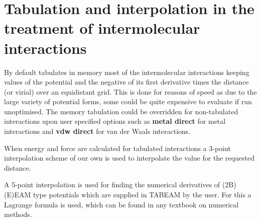 \section{Tabulation and interpolation in the treatment of intermolecular interactions}

By default \D tabulates in memory most of the intermolecular interactions
keeping values of the potential and the negative of its first derivative
times the distance (or virial) over an equidistant grid.  This is done
for reasons of speed as due to the large variety of potential forms, some
could be quite expensive to evaluate if run unoptimised.  The memory
tabulation could be overridden for non-tabulated interactions upon user
specified options such as {\bf metal direct} for metal interactions and
{\bf vdw direct} for van der Waals interactions.

When energy and force are calculated for tabulated interactions a 3-point
interpolation scheme of our own is used to interpolate the value for the
requested distance.

A 5-point interpolation is used for finding the numerical derivatives of
(2B)(E)EAM type potentials which are supplied in TABEAM by the user.  For
this a Lagrange formula is used, which can be found in any textbook on
numerical methods.
